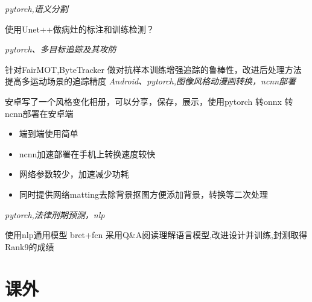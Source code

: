 \documentclass{uniquecv}
\begin{document}
\textit{pytorch,语义分割}
\vspace{0.4ex}

使用Unet++做病灶的标注和训练检测？

\textit{pytorch、多目标追踪及其攻防}
\vspace{0.4ex}

针对FairMOT,ByteTracker 做对抗样本训练增强追踪的鲁棒性，改进后处理方法提高多运动场景的追踪精度
\textit{Android、pytorch,图像风格动漫画转换，ncnn部署}
\vspace{0.4ex}

安卓写了一个风格变化相册，可以分享，保存，展示，使用pytorch 转onnx 转 ncnn部署在安卓端
\begin{itemize}
  \item 端到端使用简单
  \item ncnn加速部署在手机上转换速度较快
  \item 网络参数较少，加速减少功耗
  \item 同时提供网络matting去除背景抠图方便添加背景，转换等二次处理
\end{itemize}
\textit{pytorch,法律刑期预测，nlp}
\vspace{0.4ex}

使用nlp通用模型 bret+fcn 采用Q&A阅读理解语言模型,改进设计并训练,封测取得Rank9的成绩

\section{课外}
\end{document}
